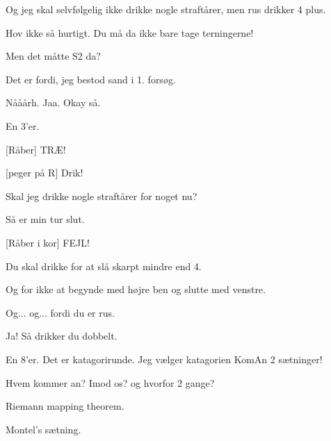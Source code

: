 \documentclass[a4paper,11pt]{article}
\begin{document}
\begin{sketch}
 Og jeg skal selvfølgelig ikke drikke nogle straftårer, men rus drikker 4 plus. 


 Hov ikke så hurtigt. Du må da ikke bare tage terningerne! 

 Men det måtte S2 da? 

 Det er fordi, jeg bestod sand i 1. forsøg. 

 Nååårh. Jaa. Okay så. 


 En 3'er. 


 [Råber] TRÆ!


 [peger på R] Drik!


 Skal jeg drikke nogle straftårer for noget nu? 


 Så er min tur slut.

[Råber i kor] FEJL! 

 Du skal drikke for at slå skarpt mindre end 4. 

 Og for ikke at begynde med højre ben og slutte med venstre. 


 Og... og...  fordi du er rus. 

 Ja! Så drikker du dobbelt.



 En 8'er. Det er katagorirunde. Jeg vælger katagorien KomAn 2 sætninger!

 Hvem kommer an? Imod os?  og hvorfor 2 gange? 

 Riemann mapping theorem.

 Montel's sætning.


\end{sketch}
\end{document}
